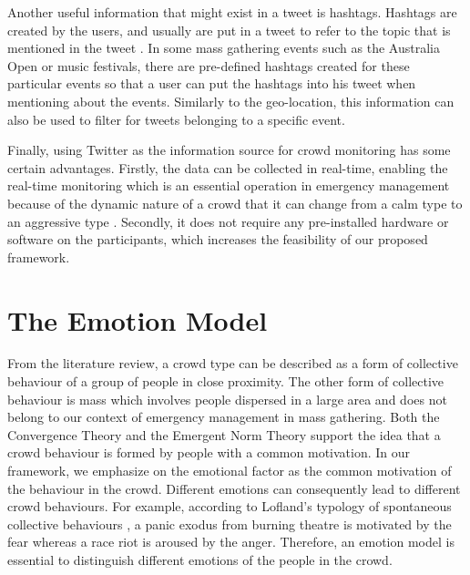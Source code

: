Another useful information that might exist in a tweet is hashtags. Hashtags are created by the users, and usually are put in a tweet to refer to the topic that is mentioned in the tweet \cite{mohammad2014using}. In some mass gathering events such as the Australia Open or music festivals, there are pre-defined hashtags created for these particular events so that a user can put the hashtags into his tweet when mentioning about the events. Similarly to the geo-location, this information can also be used to filter for tweets belonging to a specific event.

Finally, using Twitter as the information source for crowd monitoring has some certain advantages. Firstly, the data can be collected in real-time, enabling the real-time monitoring which is an essential operation in emergency management because of the dynamic nature of a crowd that it can change from a calm type to an aggressive type \citep{Berlonghi1995}. Secondly, it does not require any pre-installed hardware or software on the participants, which increases the feasibility of our proposed framework.

\section{The Emotion Model}

From the literature review, a crowd type can be described as a form of collective behaviour of a group of people in close proximity. The other form of collective behaviour is mass which involves people dispersed in a large area and does not belong to our context of emergency management in mass gathering. Both the Convergence Theory and the Emergent Norm Theory \citep{mcphail1991myth} support the idea that a crowd behaviour is formed by people with a common motivation. In our framework, we emphasize on the emotional factor as the common motivation of the behaviour in the crowd. Different emotions can consequently lead to different crowd behaviours. For example, according to Lofland's typology of spontaneous collective behaviours \citep{Kornblum2011}, a panic exodus from burning theatre is motivated by the fear whereas a race riot is aroused by the anger. Therefore, an emotion model is essential to distinguish different emotions of the people in the crowd.

